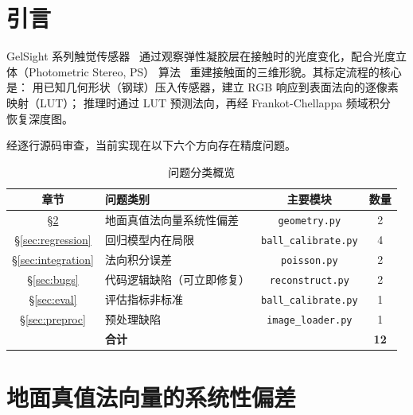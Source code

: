\tableofcontents
\newpage

\section{引言}
\label{sec:intro}

GelSight 系列触觉传感器~\cite{johnson2009retrographic,yuan2017gelsight}
通过观察弹性凝胶层在接触时的光度变化，配合光度立体（Photometric Stereo, PS）
算法~\cite{woodham1980photometric} 重建接触面的三维形貌。其标定流程的核心是：
用已知几何形状（钢球）压入传感器，建立 RGB 响应到表面法向的逐像素映射（LUT）；
推理时通过 LUT 预测法向，再经 Frankot-Chellappa 频域积分~\cite{frankot1988method}
恢复深度图。

经逐行源码审查，当前实现在以下六个方向存在精度问题。

\begin{table}[ht]
  \centering
  \caption{问题分类概览}
  \label{tab:overview}
  \begin{tabular}{clcc}
    \toprule
    \textbf{章节} & \textbf{问题类别} & \textbf{主要模块} & \textbf{数量} \\
    \midrule
    \S\ref{sec:gt_bias}     & 地面真值法向量系统性偏差   & \texttt{geometry.py}        & 2 \\
    \S\ref{sec:regression}  & 回归模型内在局限           & \texttt{ball\_calibrate.py} & 4 \\
    \S\ref{sec:integration} & 法向积分误差               & \texttt{poisson.py}         & 2 \\
    \S\ref{sec:bugs}        & 代码逻辑缺陷（可立即修复） & \texttt{reconstruct.py}     & 2 \\
    \S\ref{sec:eval}        & 评估指标非标准             & \texttt{ball\_calibrate.py} & 1 \\
    \S\ref{sec:preproc}     & 预处理缺陷                 & \texttt{image\_loader.py}   & 1 \\
    \midrule
    & \textbf{合计} & & \textbf{12} \\
    \bottomrule
  \end{tabular}
\end{table}

\section{地面真值法向量的系统性偏差}
\label{sec:gt_bias}

